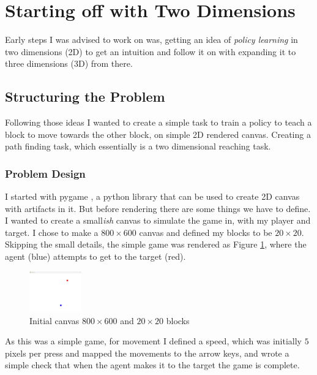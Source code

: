 \section{Starting off with Two Dimensions}
Early steps I was advised to work on was, getting an idea of \emph{policy learning} in two dimensions (2D) to get an intuition and follow it on with expanding it to three dimensions (3D) from there.

\subsection{Structuring the Problem}\label{subsec:ew-2d-problem}
Following those ideas I wanted to create a simple task to train a policy to teach a block to move towards the other block, on simple 2D rendered canvas. Creating a path finding task, which essentially is a two dimensional reaching task.

\subsubsection{Problem Design} 
I started with pygame \cite{pygame}, a python library that can be used to create 2D canvas with artifacts in it. But before rendering there are some things we have to define. I wanted to create a small\emph{ish} canvas to simulate the game in, with my player and target. I chose to make a $800 \times 600$ canvas and defined my blocks to be $20 \times 20$. Skipping the small details, the simple game was rendered as Figure \ref{fig:initial-canvas}, where the agent (blue) attempts to get to the target (red).

\begin{figure}[h]
  \centering
  \includegraphics[width=0.2\textwidth]{assets/early-work/initial-canvas.png}
  \caption{Initial canvas $800 \times 600$ and $20 \times 20$ blocks}\label{fig:initial-canvas}
\end{figure}

As this was a simple game, for movement I defined a speed, which was initially $5$ pixels per press and mapped the movements to the arrow keys, and wrote a simple check that when the agent makes it to the target the game is complete.

